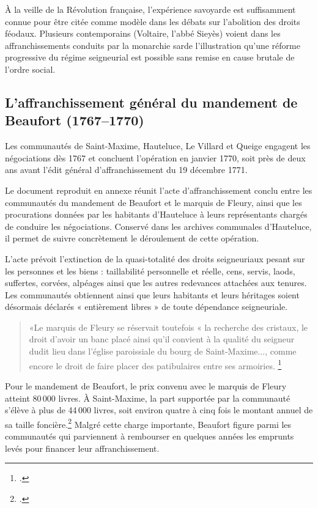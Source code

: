 \documentclass[12pt,a4paper]{report}
\begin{document}
À la veille de la Révolution française, l'expérience savoyarde est suffisamment connue pour être citée comme modèle dans les débats sur l'abolition des droits féodaux. Plusieurs contemporains (Voltaire, l'abbé Sieyès) voient dans les affranchissements conduits par la monarchie sarde l'illustration qu'une réforme progressive du régime seigneurial est possible sans remise en cause brutale de l'ordre social.

\subsection{L'affranchissement général du mandement de Beaufort (1767--1770)}

Les communautés de Saint-Maxime, Hauteluce, Le Villard et Queige engagent les négociations dès 1767 et concluent l'opération en janvier 1770, soit près de deux ans avant l'édit général d'affranchissement du 19 décembre 1771.

Le document reproduit en annexe réunit l'acte d'affranchissement conclu entre les communautés du mandement de Beaufort et le marquis de Fleury, ainsi que les procurations données par les habitants d'Hauteluce à leurs représentants chargés de conduire les négociations. Conservé dans les archives communales d'Hauteluce, il permet de suivre concrètement le déroulement de cette opération.



L'acte prévoit l'extinction de la quasi-totalité des droits seigneuriaux pesant sur les personnes et les biens : taillabilité personnelle et réelle, cens, servis, laods, suffertes, corvées, alpéages ainsi que les autres redevances attachées aux tenures. Les communautés obtiennent ainsi que leurs habitants et leurs héritages soient désormais déclarés « entièrement libres » de toute dépendance seigneuriale.
\begin{quote}
	«Le marquis de Fleury se réservait toutefois « la recherche des cristaux, le droit d'avoir un banc placé ainsi qu'il convient à la qualité du seigneur dudit lieu dans l'église paroissiale du bourg de Saint-Maxime..., comme encore le droit de faire placer des patibulaires entre ses armoiries.	\footcite[426]{Bruchet1908Abolition}
\end{quote}

Pour le mandement de Beaufort, le prix convenu avec le marquis de Fleury atteint 80\,000 livres. À Saint-Maxime, la part supportée par la communauté s'élève à plus de 44\,000 livres, soit environ quatre à cinq fois le montant annuel de sa taille foncière.\footcite[LXXXI, 426]{Bruchet1908Abolition} Malgré cette charge importante, Beaufort figure parmi les communautés qui parviennent à rembourser en quelques années les emprunts levés pour financer leur affranchissement.
\end{document}
